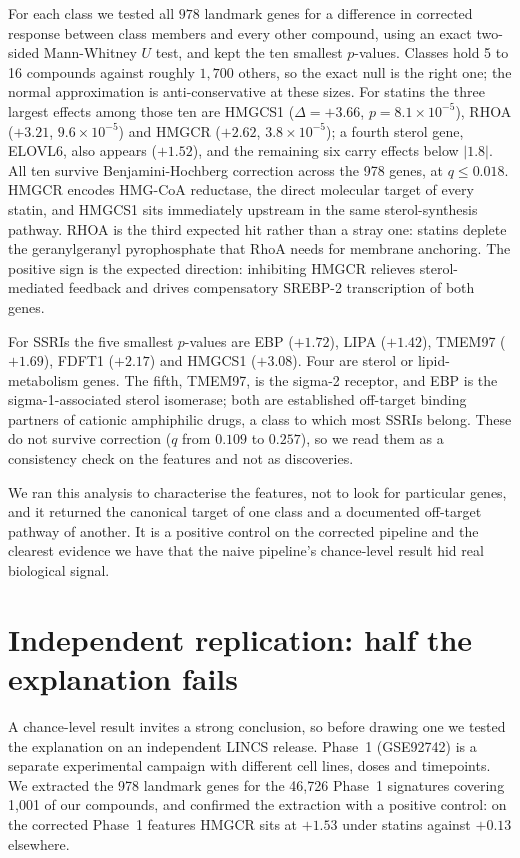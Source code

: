 \documentclass[conference]{IEEEtran}
\begin{document}
For each class we tested all $978$ landmark genes for a difference in corrected
response between class members and every other compound, using an exact
two-sided Mann-Whitney $U$ test, and kept the ten smallest $p$-values. Classes
hold 5 to 16 compounds against roughly $1{,}700$ others, so the exact null is
the right one; the normal approximation is anti-conservative at these sizes.
For statins the three largest effects among those ten are HMGCS1
($\Delta = +3.66$, $p = 8.1 \times 10^{-5}$), RHOA ($+3.21$,
$9.6 \times 10^{-5}$) and HMGCR ($+2.62$, $3.8 \times 10^{-5}$); a fourth
sterol gene, ELOVL6, also appears ($+1.52$), and the remaining six carry effects
below $|1.8|$. All ten survive Benjamini-Hochberg correction across the 978
genes, at $q \le 0.018$. HMGCR encodes
HMG-CoA reductase, the direct molecular target of every statin, and HMGCS1 sits
immediately upstream in the same sterol-synthesis pathway. RHOA is the third
expected hit rather than a stray one: statins deplete the geranylgeranyl
pyrophosphate that RhoA needs for membrane anchoring. The positive sign is
the expected direction: inhibiting HMGCR relieves sterol-mediated feedback and
drives compensatory SREBP-2 transcription of both genes.

For SSRIs the five smallest $p$-values are EBP ($+1.72$), LIPA ($+1.42$),
TMEM97 ($+1.69$), FDFT1 ($+2.17$) and HMGCS1 ($+3.08$). Four are sterol or
lipid-metabolism genes. The fifth, TMEM97, is the sigma-2 receptor, and EBP is
the sigma-1-associated sterol isomerase; both are established off-target
binding partners of cationic amphiphilic drugs, a class to which most SSRIs
belong. These do not survive correction ($q$ from $0.109$ to $0.257$), so we
read them as a consistency check on the features and not as discoveries.

We ran this analysis to characterise the features, not to look for particular
genes, and it returned the canonical target of one class and a documented
off-target pathway of another. It is a positive control on the corrected
pipeline and the clearest evidence we have that the naive pipeline's
chance-level result hid real biological signal.

\section{Independent replication: half the explanation fails}
\label{sec:repl}

A chance-level result invites a strong conclusion, so before drawing one we
tested the explanation on an independent LINCS release. Phase~1 (GSE92742) is a
separate experimental campaign with different cell lines, doses and timepoints.
We extracted the 978 landmark genes for the 46{,}726 Phase~1 signatures covering
1{,}001 of our compounds, and confirmed the extraction with a positive control:
on the corrected Phase~1 features HMGCR sits at $+1.53$ under statins against $+0.13$ elsewhere.
\end{document}
